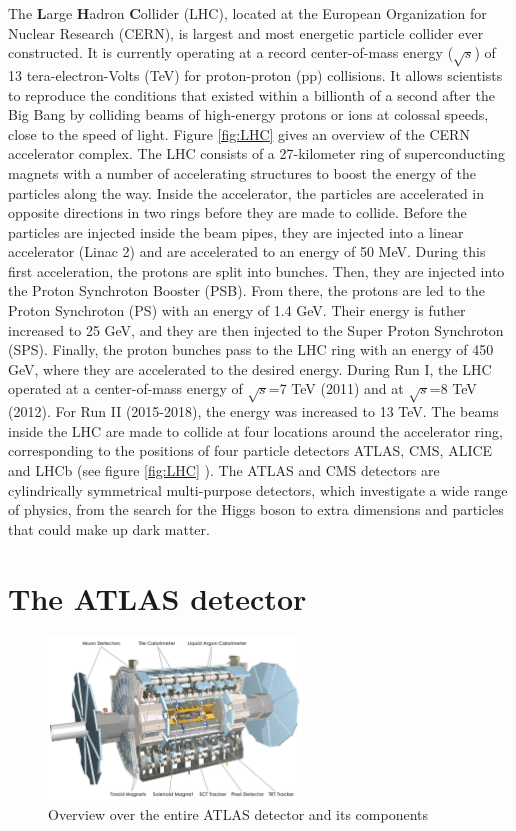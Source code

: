 The \textbf{L}arge \textbf{H}adron \textbf{C}ollider (LHC), located at the European Organization for Nuclear Research (CERN), is largest and most energetic particle collider ever constructed. It is currently operating at a record center-of-mass energy ($\sqrt{s}$) of 13 tera-electron-Volts (TeV) for proton-proton (pp) collisions. It allows scientists to reproduce the conditions that existed within a billionth of a second after the Big Bang by colliding beams of high-energy protons or ions at colossal speeds, close to the speed of light. Figure \ref{fig:LHC} gives an overview of the CERN accelerator complex. The LHC consists of a 27-kilometer ring of superconducting magnets with a number of accelerating structures to boost the energy of the particles along the way. Inside the accelerator, the particles are accelerated in opposite directions in two rings before they are made to collide. Before the particles are injected inside the beam pipes, they are injected into a linear accelerator (Linac 2) and are accelerated to an energy of 50 MeV. During this first acceleration, the protons are split into bunches. Then, they are injected into the Proton Synchroton Booster (PSB). From there, the protons are led to the Proton Synchroton (PS) with an energy of 1.4 GeV. Their energy is futher increased to 25 GeV, and they are then injected to the Super Proton Synchroton (SPS). Finally, the proton bunches pass to the LHC ring with an energy of 450 GeV, where they are accelerated to the desired energy. During Run I, the LHC operated at a center-of-mass energy of $\sqrt{s}$=7 TeV (2011) and at $\sqrt{s}$=8 TeV (2012). For Run II (2015-2018), the energy was increased to 13 TeV. The beams inside the LHC are made to collide at four locations around the accelerator ring, corresponding to the positions of four particle detectors ATLAS, CMS, ALICE and LHCb (see figure \ref{fig:LHC} ). The ATLAS and CMS detectors are cylindrically symmetrical multi-purpose detectors, which investigate a wide range of physics, from the search for the Higgs boson to extra dimensions and particles that could make up dark matter.

\section{The ATLAS detector}
\label{sec:ATLAS}


\begin{figure}[!h]
\centering
\includegraphics[width=0.6\textwidth]{ubonn-thesis/Chapters/Chapters_03/Figure/ATLAS_detector.pdf}
\caption{Overview over the entire ATLAS detector and its components \cite{PequenaoA}}
\label{fig:atlasdetector}
\end{figure}

